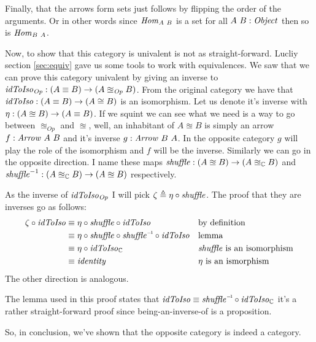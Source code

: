 Finally, that the arrows form sets just follows by flipping the order of the
arguments. Or in other words since $\mathit{Hom}_{A\ B}$ is a set for all $A\ B \;\mathord{:}\;
\mathit{Object}$ then so is $\mathit{Hom}_{B\ A}$.

Now, to show that this category is univalent is not as straight-forward. Lucliy
section \ref{sec:equiv} gave us some tools to work with equivalences.
We saw that we
can prove this category univalent by giving an inverse to
$\mathit{idToIso}_{\mathit{Op}} \;\mathord{:}\; (A \equiv B) \to (A \approxeq_{\mathit{Op}} B)$.
From the original category we have that $\mathit{idToIso} \;\mathord{:}\; (A \equiv B) \to (A \cong
B)$ is an isomorphism. Let us denote it's inverse with $\eta \;\mathord{:}\; (A \approxeq B)
\to (A \equiv B)$. If we squint we can see what we need is a way to go between
$\approxeq_{\mathit{Op}}$ and $\approxeq$, well, an inhabitant of $A \approxeq
B$ is simply an arrow $f \;\mathord{:}\; \mathit{Arrow}\ A\ B$ and it's inverse $g \;\mathord{:}\;
\mathit{Arrow}\ B\ A$. In the opposite category $g$ will play the role of the
isomorphism and $f$ will be the inverse. Similarly we can go in the opposite
direction. I name these maps $\mathit{shuffle} \;\mathord{:}\; (A \approxeq B) \to (A
\approxeq_{\mathbb{C}} B)$ and $\mathit{shuffle}^{-1} : (A \approxeq_{\mathbb{C}} B) \to (A
\approxeq B)$ respectively.

As the inverse of $\mathit{idToIso}_{\mathit{Op}}$ I will pick $\zeta \triangleq \eta \circ
\mathit{shuffle}$. The proof that they are inverses go as follows:
%
\begin{align*}
\zeta \comp \idToIso & \equiv
\eta \comp \shuffle \comp \idToIso
&& \text{by definition} \\
%
& \equiv
\eta \comp \shuffle \comp \inv{\shuffle} \comp \idToIso
&& \text{lemma} \\
& \equiv
\eta \comp \idToIso_{\bC}
&& \text{$\shuffle$ is an isomorphism} \\
& \equiv
\identity
&& \text{$\eta$ is an ismorphism}
\end{align*}
%
The other direction is analogous.

The lemma used in this proof states that $\idToIso \equiv \inv{\shuffle} \comp
\idToIso_{\bC}$ it's a rather straight-forward proof since being-an-inverse-of
is a proposition.

So, in conclusion, we've shown that the opposite category is indeed a category.

